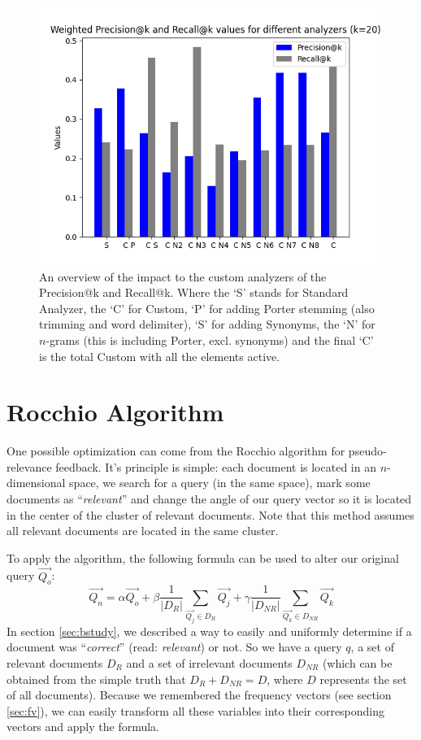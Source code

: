 \documentclass[11pt]{article}
\begin{document}
\begin{figure}[htp]
	\centering
	\includegraphics[width=\textwidth]{images/Hist-at-k}
	\caption{An overview of the impact to the custom analyzers of the \textsf{Precision@k} and \textsf{Recall@k}. Where the `S' stands for Standard Analyzer, the `C' for Custom, `P' for adding Porter stemming (also trimming and word delimiter), `S' for adding Synonyms, the `N' for $n$-grams (this is including Porter, excl. synonyms) and the final `C' is the total Custom with all the elements active.}
	\label{fig:prk}
\end{figure}

\newpage
\section{Rocchio Algorithm}\label{sec:rocchio}
One possible optimization can come from the \textsf{Rocchio} algorithm for pseudo-relevance feedback. It's principle is simple: each document is located in an $n$-dimensional space, we search for a query (in the same space), mark some documents as ``\textit{relevant}'' and change the angle of our query vector so it is located in the center of the cluster of relevant documents. Note that this method assumes all relevant documents are located in the same cluster.

To apply the algorithm, the following formula can be used to alter our original query $\overrightarrow{Q_o}$:
$$\overrightarrow{Q_n} = \alpha \overrightarrow{Q_o} + \beta \frac{1}{|D_R|} \sum_{\overrightarrow{Q_j} \in D_R}{\overrightarrow{Q_j}} + \gamma \frac{1}{|D_{NR}|} \sum_{\overrightarrow{Q_k} \in D_{NR}}{\overrightarrow{Q_k}}$$
In section \ref{sec:bstudy}, we described a way to easily and uniformly determine if a document was ``\textit{correct}'' (read: \textit{relevant}) or not. So we have a query $q$, a set of relevant documents $D_R$ and a set of irrelevant documents $D_{NR}$ (which can be obtained from the simple truth that $D_R + D_{NR} = D$, where $D$ represents the set of all documents). Because we remembered the frequency vectors (see section \ref{sec:fv}), we can easily transform all these variables into their corresponding vectors and apply the formula.
\end{document}

